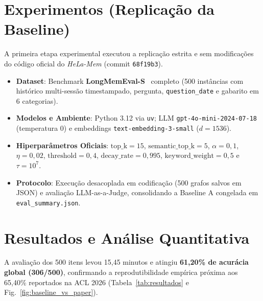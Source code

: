 \documentclass[10pt,conference,twocolumn]{IEEEtran}
\begin{document}
\section{Experimentos (Replicação da Baseline)}

A primeira etapa experimental executou a replicação estrita e sem modificações do código oficial do \textit{HeLa-Mem} (commit \texttt{68f19b3}).
\begin{itemize}
    \item \textbf{Dataset}: Benchmark \textbf{LongMemEval-S}~\cite{longmemeval2025} completo (500 instâncias com histórico multi-sessão timestampado, pergunta, \texttt{question\_date} e gabarito em 6 categorias).
    \item \textbf{Modelos e Ambiente}: Python 3.12 via \texttt{uv}; LLM \texttt{gpt-4o-mini-2024-07-18} (temperatura 0) e embeddings \texttt{text-embedding-3-small} ($d=1536$).
    \item \textbf{Hiperparâmetros Oficiais}: $\text{top\_k}=15$, $\text{semantic\_top\_k}=5$, $\alpha=0,1$, $\eta=0,02$, $\text{threshold}=0,4$, $\text{decay\_rate}=0,995$, $\text{keyword\_weight}=0,5$ e $\tau=10^7$.
    \item \textbf{Protocolo}: Execução desacoplada em codificação (500 grafos salvos em JSON) e avaliação LLM-as-a-Judge, consolidando a Baseline A congelada em \texttt{eval\_summary.json}.
\end{itemize}

\section{Resultados e Análise Quantitativa}

A avaliação dos 500 itens levou 15,45 minutos e atingiu \textbf{61,20\% de acurácia global (306/500)}, confirmando a reprodutibilidade empírica próxima aos 65,40\% reportados na ACL 2026 (Tabela~\ref{tab:resultados} e Fig.~\ref{fig:baseline_vs_paper}).
\end{document}
